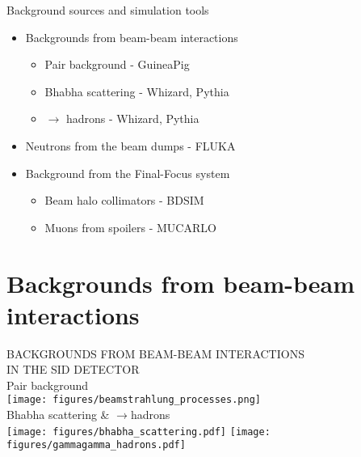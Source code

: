 \documentclass[xcolor={dvipsnames}]{beamer}
\begin{document}
\begin{frame}{Background sources and simulation tools}
{\begin{itemize}
   \item Backgrounds from beam-beam interactions
    \begin{itemize}
      \item Pair background - GuineaPig
      \item Bhabha scattering - Whizard, Pythia
      \item \textgamma \textgamma $\rightarrow$ hadrons  - Whizard, Pythia
    \end{itemize}
    \item Neutrons from the beam dumps - FLUKA
    \item Background from the Final-Focus system
    \begin{itemize}
     \item Beam halo collimators - BDSIM
     \item \alert{Muons from spoilers - MUCARLO}
    \end{itemize}
  \end{itemize}
  }

\end{frame}

\section{Backgrounds from beam-beam interactions}

\begin{frame}
 \begin{center}
  \alert{\MakeUppercase{Backgrounds from beam-beam interactions}\\ \MakeUppercase{in the SiD detector}\\ 
  \vspace*{0.5cm}
  Pair background}\\
   \vspace*{0.3cm}
  \texttt{[image: figures/beamstrahlung\_processes.png]}\\
  \vspace*{0.5cm}
  \alert{Bhabha scattering \& \textgamma \textgamma $\rightarrow$hadrons}\\
  \vspace*{0.3cm}
  \texttt{[image: figures/bhabha\_scattering.pdf]} 
 \texttt{[image: figures/gammagamma\_hadrons.pdf]}
  \end{center}
\end{frame}
\end{document}
